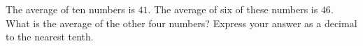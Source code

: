 The average of ten numbers is $41$. The average of six of these numbers is $46$. What is the average of the other four numbers? Express your answer as a decimal to the nearest tenth.
